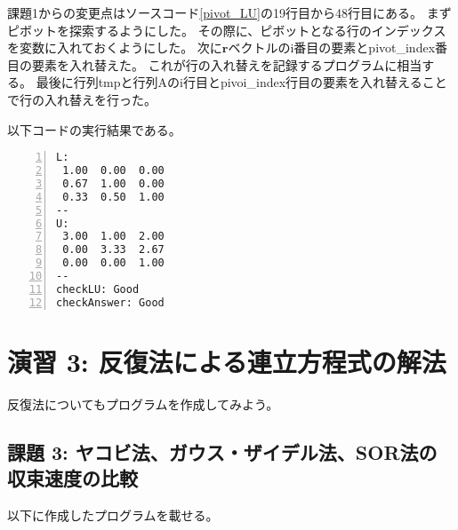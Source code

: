 \documentclass[a4paper]{jsarticle}
\begin{document}
課題1からの変更点はソースコード\ref{pivot_LU}の19行目から48行目にある。
まずピボットを探索するようにした。
その際に、ピボットとなる行のインデックスを変数に入れておくようにした。
次に\(\bm{r}\)ベクトルのi番目の要素とpivot\_index番目の要素を入れ替えた。
これが行の入れ替えを記録するプログラムに相当する。
最後に行列tmpと行列Aのi行目とpivoi\_index行目の要素を入れ替えることで行の入れ替えを行った。

以下コードの実行結果である。

\begin{lstlisting}[caption={\texttt{ピボット選択付きLU分解のコードの実行結果}}, numbers=left, label={pivot_LU_result}]
  L:
 1.00  0.00  0.00
 0.67  1.00  0.00
 0.33  0.50  1.00
--
U:
 3.00  1.00  2.00
 0.00  3.33  2.67
 0.00  0.00  1.00
--
checkLU: Good
checkAnswer: Good

\end{lstlisting}

\section*{演習 3: 反復法による連立方程式の解法}

反復法についてもプログラムを作成してみよう。

\subsection*{課題 3: ヤコビ法、ガウス・ザイデル法、SOR法の収束速度の比較}

以下に作成したプログラムを載せる。
\end{document}
